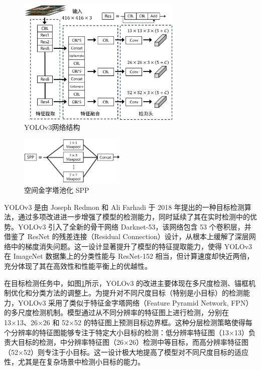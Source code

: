\documentclass[11pt,twocolumn]{ctexart}
\begin{document}
\begin{figure}[!hbtp]
  \begin{center}
  \includegraphics[width=0.7\textwidth]{figure/YOLOv3结构图}
    \end{center}
  \caption{YOLOv3网络结构}
  \label{YOLOV3网络结构}
\end{figure}


\begin{figure}[!hbtp]
  \begin{center}
  \includegraphics[width=0.45\textwidth]{figure/SPP}
    \end{center}
  \caption{空间金字塔池化 SPP}
  \label{SPP}
\end{figure}

YOLOv3\cite{farhadi2018yolov3} 是由 Joseph Redmon 和 Ali Farhadi 于 2018 年提出的一种目标检测算法，通过多项改进进一步增强了模型的检测能力，同时延续了其在实时检测中的优势。YOLOv3 引入了全新的骨干网络 Darknet-53，该网络包含 53 个卷积层，并借鉴了 ResNet\cite{he2016deep} 的残差连接（Residual Connection）设计，从根本上缓解了深层网络中的梯度消失问题。这一设计显著提升了模型的特征提取能力，使得 YOLOv3 在 ImageNet 数据集上的分类性能与 ResNet-152 相当，但计算速度却快近两倍，充分体现了其在高效性和性能平衡上的优越性。

在目标检测任务中，如图\ref{YOLOV3网络结构}所示，YOLOv3 的改进主要体现在多尺度检测、锚框机制优化和分类方法的调整上。为提升对不同尺度目标（特别是小目标）的检测能力，YOLOv3 采用了类似于特征金字塔网络（Feature Pyramid Network, FPN）\cite{lin2017feature}的多尺度检测机制。模型通过从不同分辨率的特征图上进行检测，分别在 13×13、26×26 和 52×52 的特征图上预测目标边界框。这种分层检测策略使得每个分辨率的特征图能够专注于特定大小目标的检测：低分辨率特征图（13×13）负责大目标的检测，中分辨率特征图（26×26）检测中等目标，而高分辨率特征图（52×52）则专注于小目标。这一设计极大地提高了模型对不同尺度目标的适应性，尤其是在复杂场景中检测小目标的能力。
\end{document}
